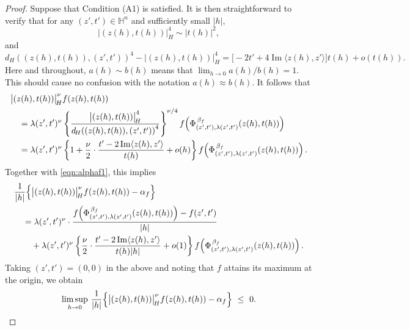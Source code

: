 \documentclass[10pt,a4paper]{amsart}
\begin{document}
\begin{proof}
Suppose that Condition (A1) is satisfied. It is then straightforward to verify that for any $(z', t') \in \mathbb{H}^n$ and sufficiently small $|h|$, 
\[
\bigl|(z(h),t(h)) \bigr|_{\! H}^4 \sim |t(h)|^2,
\]
and
\[
d_{\! H} \!\left((z(h), t(h)), (z', t')\right)^4 - \bigl|(z(h),t(h)) \bigr|_{\! H}^4
= \bigl[ -2t' + 4 \operatorname{Im} \langle z(h), z' \rangle \bigr] t(h) + o(t(h)).
\]
Here and throughout, $a(h) \sim b(h)$ means that $\lim_{h\to 0} a(h)/b(h) =1$. 
This should cause no confusion with the notation $a(h) \approx b(h)$.
It follows that
\begin{align}
& \bigl|(z(h), t(h)) \bigr|_{\! H}^{\nu} f(z(h), t(h)) \notag \\
&\quad = \lambda(z', t')^{\nu} \left\{ \frac{\bigl|(z(h),t(h)) \bigr|_{\! H}^4}{d_{\! H} \!\left((z(h), t(h)), (z', t')\right)^4} \right\}^{\nu/4} 
f \!\left( \Phi_{(z', t'), \lambda(z', t')}^{\, \beta_f} (z(h), t(h)) \right) \notag \\
&\quad = \lambda(z', t')^{\nu} \left\{ 1 + \frac{\nu}{2} \cdot \frac{t' - 2 \operatorname{Im} \langle z(h), z' \rangle}{t(h)} + o(h) \right\}
f \!\left( \Phi_{(z', t'), \lambda(z', t')}^{\, \beta_f} (z(h), t(h)) \right). \notag
\end{align}
Together with \eqref{eqn:alphaf1}, this implies
\begin{align}
& \frac{1}{|h|} \Bigl\{ \bigl|(z(h),t(h)) \bigr|_{\! H}^{\nu} f(z(h), t(h)) - \alpha_f \Bigr\} \notag \\
&\quad = \lambda(z', t')^{\nu} \cdot \frac{ f \!\left( \Phi_{(z', t'), \lambda(z', t')}^{\, \beta_f}
(z(h), t(h)) \right) - f(z', t') }{|h|} \notag \\
&\qquad + \lambda(z', t')^{\nu} \left\{ \frac{\nu}{2} \cdot \frac{t' - 2 \operatorname{Im} \langle z(h), z' \rangle}{t(h) |h|} + o(1) \right\}
f \!\left( \Phi_{(z', t'), \lambda(z', t')}^{\, \beta_f} (z(h), t(h)) \right). \label{eqn:asym02}
\end{align}
Taking $(z', t') = (0, 0)$ in the above and noting that $f$ attains its maximum at the origin, we obtain
\begin{equation}
\limsup_{h \to 0} \, \frac{1}{|h|} \Bigl\{ \bigl|(z(h),t(h)) \bigr|_{\! H}^{\nu} f(z(h), t(h)) - \alpha_f 
\Bigr\} ~\leq~ 0.
\end{equation}


\end{proof}
\end{document}
